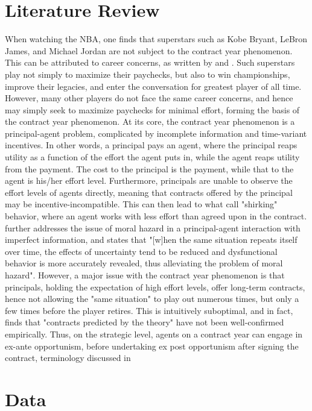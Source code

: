 \documentclass[12pt]{article}
\begin{document}
	\section{Literature Review} \label{sec:literature}
	When watching the NBA, one finds that superstars such as Kobe Bryant, LeBron James, and Michael Jordan are not subject to the contract year phenomenon. This can be attributed to career concerns, as written by \cite{holmstrom_contracts_1999} and \cite{gibbons_1992}. Such superstars play not simply to maximize their paychecks, but also to win championships, improve their legacies, and enter the conversation for greatest player of all time. However, many other players do not face the same career concerns, and hence may simply seek to maximize paychecks for minimal effort, forming the basis of the contract year phenomenon.
	At its core, the contract year phenomenon is a principal-agent problem, complicated by incomplete information and time-variant incentives. In other words, a principal pays an agent, where the principal reaps utility as a function of the effort the agent puts in, while the agent reaps utility from the payment. The cost to the principal is the payment, while that to the agent is his/her effort level. Furthermore, principals are unable to observe the effort levels of agents directly, meaning that contracts offered by the principal may be incentive-incompatible. This can then lead to what \cite{alchian_1972} call "shirking" behavior, where an agent works with less effort than agreed upon in the contract. \cite{holmstrom_contracts_1999} further addresses the issue of moral hazard in a principal-agent interaction with imperfect information, and states that "[w]hen the same situation repeats itself over time, the effects of uncertainty tend to be reduced and dysfunctional behavior is more accurately revealed, thus alleviating the problem of moral hazard". However, a major issue with the contract year phenomenon is that principals, holding the expectation of high effort levels, offer long-term contracts, hence not allowing the "same situation" to play out numerous times, but only a few times before the player retires. This is intuitively suboptimal, and in fact, \cite{prendergast_1999} finds that "contracts predicted by the theory" have not been well-confirmed empirically. Thus, on the strategic level, agents on a contract year can engage in ex-ante opportunism, before undertaking ex post opportunism after signing the contract, terminology discussed in \cite{ress_1994}

	\section{Data} \label{sec:data}
\end{document}
